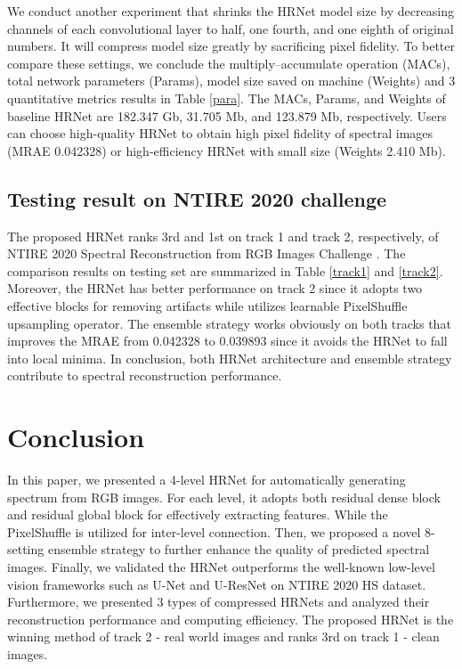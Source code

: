 \documentclass[10pt,twocolumn,letterpaper]{article}
\begin{document}
We conduct another experiment that shrinks the HRNet model size by decreasing channels of each convolutional layer to half, one fourth, and one eighth of original numbers. It will compress model size greatly by sacrificing pixel fidelity. To better compare these settings, we conclude the multiply–accumulate operation (MACs), total network parameters (Params), model size saved on machine (Weights) and 3 quantitative metrics results in Table \ref{para}. The MACs, Params, and Weights of baseline HRNet are 182.347 Gb, 31.705 Mb, and 123.879 Mb, respectively. Users can choose high-quality HRNet to obtain high pixel fidelity of  spectral images (MRAE  0.042328) or high-efficiency HRNet with small size (Weights  2.410 Mb).

\subsection{Testing result on NTIRE 2020 challenge}

The proposed HRNet ranks 3rd and 1st on track 1 and track 2, respectively, of NTIRE 2020 Spectral Reconstruction from RGB Images Challenge \cite{NTIREChallenge}. The comparison results on testing set are summarized in Table \ref{track1} and \ref{track2}. Moreover, the HRNet has better performance on track 2 since it adopts two effective blocks for removing artifacts while utilizes learnable PixelShuffle upsampling operator. The ensemble strategy works obviously on both tracks that improves the MRAE from 0.042328 to 0.039893 since it avoids the HRNet to fall into local minima. In conclusion, both HRNet architecture and ensemble strategy contribute to spectral reconstruction performance.

\section{Conclusion}

In this paper, we presented a 4-level HRNet for automatically generating spectrum from RGB images. For each level, it adopts both residual dense block and residual global block for effectively extracting features. While the PixelShuffle is utilized for inter-level connection. Then, we proposed a novel 8-setting ensemble strategy to further enhance the quality of predicted spectral images. Finally, we validated the HRNet outperforms the well-known low-level vision frameworks such as U-Net and U-ResNet on NTIRE 2020 HS dataset. Furthermore, we presented 3 types of compressed HRNets and analyzed their reconstruction performance and computing efficiency. The proposed HRNet is the winning method of track 2 - real world images and ranks 3rd on track 1 - clean images.

{\small


}
\end{document}
